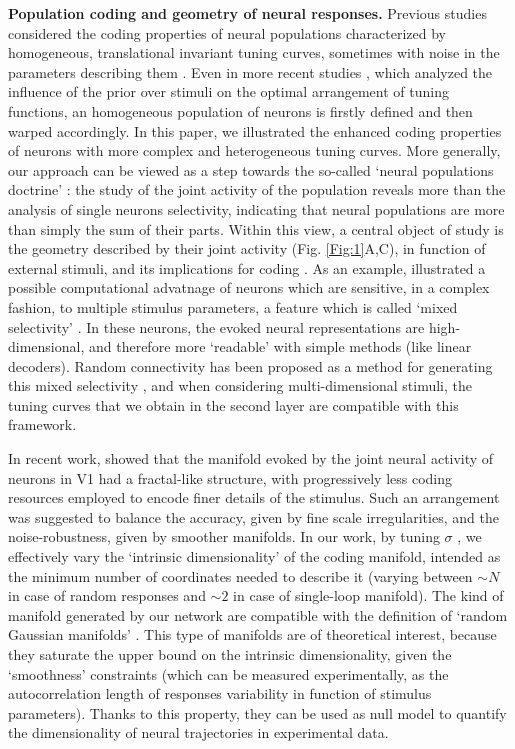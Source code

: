 \documentclass[a4paper]{article}
\begin{document}
\textbf{Population coding and geometry of neural responses.} Previous studies considered the coding properties of neural populations characterized by homogeneous, translational invariant tuning curves, sometimes with noise in the parameters describing them \cite[]{Shamir2006ImplicationsCoding,Fiscella2015VisualNeurons}. Even in more recent studies \cite[]{Ganguli2014EfficientPopulations,Yerxa2020EfficientStimuli}, which analyzed the influence of the prior over stimuli on the optimal arrangement of tuning functions, an homogeneous population of neurons is firstly defined and then warped  accordingly. In this paper, we illustrated the enhanced coding properties of neurons with more complex and heterogeneous tuning curves. More generally, our approach can be viewed as a step towards the so-called `neural populations doctrine'  \cite[]{Saxena2019TowardsDoctrine}: the study of the joint activity of the population reveals more than the analysis of  single neurons selectivity, indicating that neural populations are more than simply the sum of their parts.  Within this view, a central object of study is the geometry described by their joint activity (Fig. \ref{Fig:1}A,C), in function of external stimuli, and its implications for coding  \cite[]{Kobak2019State-dependentCortex}. As an example, \cite{Fusi2016WhyCognition} illustrated a possible computational advatnage of neurons which are sensitive, in a complex fashion, to multiple stimulus parameters, a feature which is called `mixed selectivity' \cite{Rigotti2013TheTasks}. In these neurons, the evoked neural representations are high-dimensional, and therefore more `readable' with simple methods (like linear decoders). Random connectivity has been proposed as a method for generating this mixed selectivity \cite[]{Barak2013FromDiscrimination,Lindsay2017HebbianCortex}, and when considering multi-dimensional stimuli, the tuning curves that we obtain  in the second layer are compatible with this framework.

In recent work, \cite{Stringer2019High-dimensionalCortex} showed that the manifold evoked by the joint neural activity of neurons in V1 had a fractal-like structure, with progressively less coding resources employed to encode finer details of the stimulus. Such an arrangement was suggested to balance the accuracy, given by fine scale irregularities, and the noise-robustness, given by smoother manifolds.  In our work, by tuning $\sigma$ , we effectively vary the `intrinsic dimensionality' of the coding manifold, intended as the minimum number of coordinates needed to describe it (varying between 
$\sim N$ in case of random responses and $\sim 2$ in case of single-loop manifold). The kind of manifold generated by our network are compatible with the definition of `random Gaussian manifolds'   \cite[]{Gao2017AMeasurement,Lahiri2016RandomManifolds}. This type of manifolds are of theoretical interest, because they saturate the upper bound on the intrinsic dimensionality, given the `smoothness' constraints (which can be measured experimentally, as the autocorrelation length of responses variability in function of stimulus parameters). Thanks to this property, they can be used as null model to quantify the dimensionality of neural trajectories in experimental data.  
\end{document}
